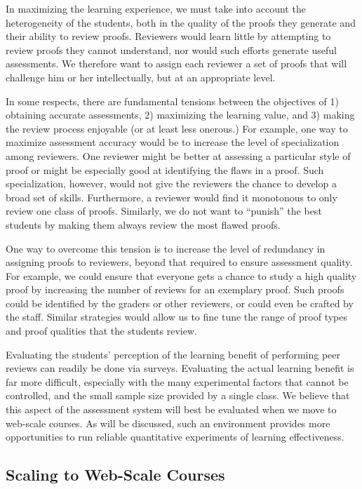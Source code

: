\documentclass[12pt]{article}
\begin{document}
In maximizing the learning experience, we must take into account the
heterogeneity of the students, both in the quality of the proofs they
generate and their ability to review proofs.  Reviewers would learn
little by attempting to review proofs they cannot understand, nor
would such efforts generate useful assessments.  We therefore want to
assign each reviewer a set of proofs that will challenge him or her
intellectually, but at an appropriate level.

In some respects, there are fundamental tensions between the
objectives of 1) obtaining accurate assessments, 2) maximizing the
learning value, and 3) making the review process enjoyable (or at
least less onerous.)  For example, one way to maximize assessment
accuracy would be to increase the level of specialization among
reviewers.  One reviewer might be better at assessing a particular
style of proof or might be especially good at identifying the flaws in
a proof.  Such specialization, however, would not give the reviewers
the chance to develop a broad set of skills.  Furthermore, a reviewer
would find it monotonous to only review one class of proofs.
Similarly, we do not want to ``punish'' the best students by making
them always review the most flawed proofs.

One way to overcome this tension is to increase the level of
redundancy in assigning proofs to reviewers, beyond that required to
ensure assessment quality.  For example, we could ensure that everyone
gets a chance to study a high quality proof by increasing the number
of reviews for an exemplary proof.  Such proofs could be identified by
the graders or other reviewers, or could even be crafted by the staff.
Similar strategies would allow us to fine tune the range of proof types
and proof qualities that the students review.

Evaluating the students' perception of the learning benefit of
performing peer reviews can readily be done via surveys.  Evaluating
the actual learning benefit is far more difficult, especially with the
many experimental factors that cannot be controlled, and the small sample size
provided by a single class.  We believe that this aspect of the
assessment system will best be evaluated when we move to web-scale
courses.  As will be discussed, such an environment provides more
opportunities to run reliable quantitative experiments of learning
effectiveness. 

\subsection{Scaling to Web-Scale Courses}
\end{document}
